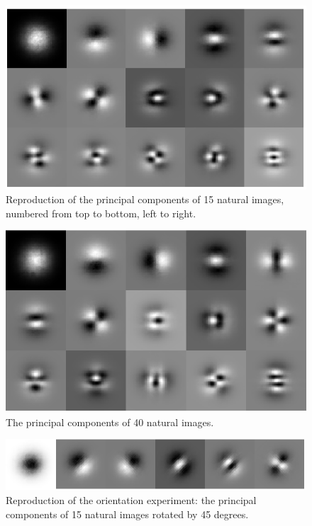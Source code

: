 \begin{figure}
    \centering
    \includegraphics[scale=0.55]{figures/Figure1.png}
    \caption{Reproduction of the principal components of 15 natural images, numbered from top to bottom, left to right.}
    \label{fig:Figure1}
\end{figure}
\begin{figure}
    \centering
    \includegraphics[scale=0.55]{figures/Figure2.png}
    \caption{The principal components of 40 natural images.}
    \label{fig:Figure2}
\end{figure}
\begin{figure}
    \centering
    \includegraphics[scale=0.55]{figures/Figure3.png}
    \caption{Reproduction of the orientation experiment: the principal components of 15 natural images rotated by 45 degrees.}
    \label{fig:Figure3}
\end{figure}

